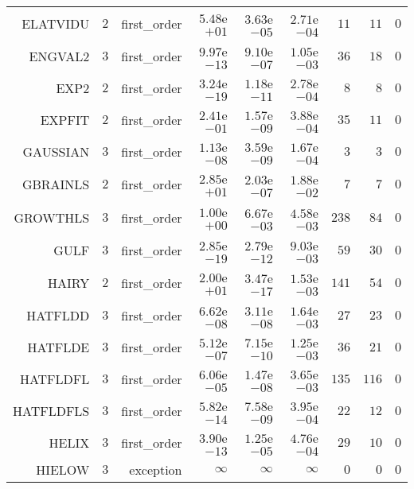 \begin{longtable}{rrrrrrrrr}
ELATVIDU & \(     2\) & first\_order & \( 5.48\)e\(+01\) & \( 3.63\)e\(-05\) & \( 2.71\)e\(-04\) & \(    11\) & \(    11\) & \(     0\) \\
ENGVAL2 & \(     3\) & first\_order & \( 9.97\)e\(-13\) & \( 9.10\)e\(-07\) & \( 1.05\)e\(-03\) & \(    36\) & \(    18\) & \(     0\) \\
EXP2 & \(     2\) & first\_order & \( 3.24\)e\(-19\) & \( 1.18\)e\(-11\) & \( 2.78\)e\(-04\) & \(     8\) & \(     8\) & \(     0\) \\
EXPFIT & \(     2\) & first\_order & \( 2.41\)e\(-01\) & \( 1.57\)e\(-09\) & \( 3.88\)e\(-04\) & \(    35\) & \(    11\) & \(     0\) \\
GAUSSIAN & \(     3\) & first\_order & \( 1.13\)e\(-08\) & \( 3.59\)e\(-09\) & \( 1.67\)e\(-04\) & \(     3\) & \(     3\) & \(     0\) \\
GBRAINLS & \(     2\) & first\_order & \( 2.85\)e\(+01\) & \( 2.03\)e\(-07\) & \( 1.88\)e\(-02\) & \(     7\) & \(     7\) & \(     0\) \\
GROWTHLS & \(     3\) & first\_order & \( 1.00\)e\(+00\) & \( 6.67\)e\(-03\) & \( 4.58\)e\(-03\) & \(   238\) & \(    84\) & \(     0\) \\
GULF & \(     3\) & first\_order & \( 2.85\)e\(-19\) & \( 2.79\)e\(-12\) & \( 9.03\)e\(-03\) & \(    59\) & \(    30\) & \(     0\) \\
HAIRY & \(     2\) & first\_order & \( 2.00\)e\(+01\) & \( 3.47\)e\(-17\) & \( 1.53\)e\(-03\) & \(   141\) & \(    54\) & \(     0\) \\
HATFLDD & \(     3\) & first\_order & \( 6.62\)e\(-08\) & \( 3.11\)e\(-08\) & \( 1.64\)e\(-03\) & \(    27\) & \(    23\) & \(     0\) \\
HATFLDE & \(     3\) & first\_order & \( 5.12\)e\(-07\) & \( 7.15\)e\(-10\) & \( 1.25\)e\(-03\) & \(    36\) & \(    21\) & \(     0\) \\
HATFLDFL & \(     3\) & first\_order & \( 6.06\)e\(-05\) & \( 1.47\)e\(-08\) & \( 3.65\)e\(-03\) & \(   135\) & \(   116\) & \(     0\) \\
HATFLDFLS & \(     3\) & first\_order & \( 5.82\)e\(-14\) & \( 7.58\)e\(-09\) & \( 3.95\)e\(-04\) & \(    22\) & \(    12\) & \(     0\) \\
HELIX & \(     3\) & first\_order & \( 3.90\)e\(-13\) & \( 1.25\)e\(-05\) & \( 4.76\)e\(-04\) & \(    29\) & \(    10\) & \(     0\) \\
HIELOW & \(     3\) & exception & \(\infty\) & \(\infty\) & \(\infty\) & \(     0\) & \(     0\) & \(     0\) \\

\end{longtable}
